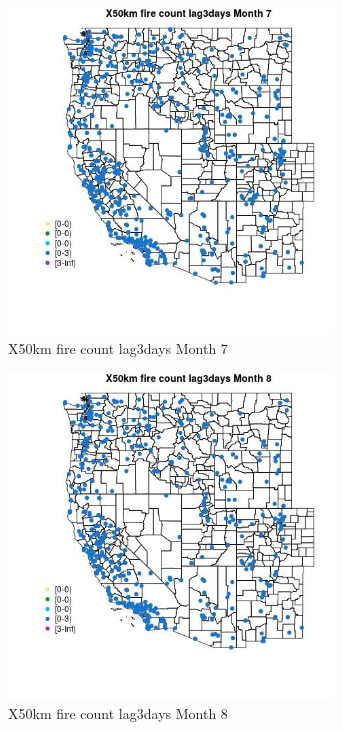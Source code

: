 \begin{figure} 
\centering  
\includegraphics[width=0.77\textwidth]{Code_Outputs/Report_ML_input_PM25_Step4_part_e_de_duplicated_aves_compiled_2019-05-14wNAs_MapObsMo7X50km_fire_count_lag3days.jpg} 
\caption{\label{fig:Report_ML_input_PM25_Step4_part_e_de_duplicated_aves_compiled_2019-05-14wNAsMapObsMo7X50km_fire_count_lag3days}X50km fire count lag3days Month 7} 
\end{figure} 
 

\begin{figure} 
\centering  
\includegraphics[width=0.77\textwidth]{Code_Outputs/Report_ML_input_PM25_Step4_part_e_de_duplicated_aves_compiled_2019-05-14wNAs_MapObsMo8X50km_fire_count_lag3days.jpg} 
\caption{\label{fig:Report_ML_input_PM25_Step4_part_e_de_duplicated_aves_compiled_2019-05-14wNAsMapObsMo8X50km_fire_count_lag3days}X50km fire count lag3days Month 8} 
\end{figure} 
 


